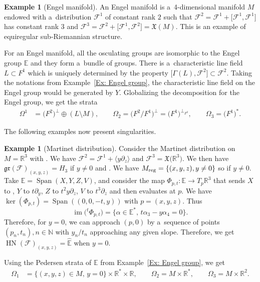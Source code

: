 \documentclass[pdftex]{sigma}
\newcommand{\tsp}[1]{{}^t \! #1} %
\newcommand{\Span}{\operatorname{Span}} %
\newcommand{\im}{\operatorname{im}} %
\newcommand{\R}{\mathbb R} %
\newcommand{\N}{\mathbb N} %
\newcommand{\F}{\mathcal{F}} %
\newcommand{\lag}{\langle}
\newcommand{\rag}{\rangle}
\newcommand{\HN}{\operatorname{HN}} %
\newcommand{\Fb}{\mathcal{F}} %
\newcommand{\gr}{\mathfrak{gr}} %
\numberwithin{equation}{section}
\theoremstyle{definition}
\newtheorem{ex}[thm]{Example}
\begin{document}
\begin{ex}[Engel manifold]
 An Engel manifold is a~4-dimensional manifold $M$ endowed with a~distribution $\F^1$ of constant rank $2$ such that $\F^2 = \F^1 + \big[\F^1,\F^1\big]$ has constant rank $3$ and $\F^3 = \F^2 + \big[\F^1,\F^2\big] = \mathfrak{X}(M)$. This is an example of equiregular sub-Riemannian structure.

 For an Engel manifold, all the osculating groups are isomorphic to the Engel group $\mathbb{E}$ and they form a~bundle of groups. There is a~characteristic line field $L \subset F^1$ which is uniquely determined by the property $\big[\Gamma(L),\F^2\big] \subset \F^2$. Taking the notations from Example~\ref{Ex: Engel group}, the characteristic line field on the Engel group would be generated by $Y$. Globalizing the decomposition for the Engel group, we get the strata
 \begin{align*}
 \Omega^1 &= \bigl(F^2\bigr)^{\perp} \oplus (L\setminus M) ,\qquad
 \Omega_2 = \bigl({F^2}/{F^1}\bigr)^{\perp} = \bigl(F^1\bigr)^{\perp_{F^2}} ,\qquad
 \Omega_3 = \bigl(F^1\bigr)^*.
 \end{align*}
\end{ex}

The following examples now present singularities.

\begin{ex}[Martinet distribution] \label{Ex: Martinet}
 Consider the Martinet distribution on $M = \R^3$ with \smash{$\F^1 = \big\lag \partial_x + \frac{y^2}{2}\partial_z,\partial_y\big\rag$}. We have $\F^2 = \F^1 + \lag y\partial_z\rag$ and $\F^3 = \mathfrak{X}\bigl(\R^3\bigr)$. We then have $\gr(\Fb)_{(x,y,z)} = H_3$ if $y\neq 0$ and \smash{$\gr(\Fb)_{(x,0,z)} = \mathbb{E}$}. We have $M_{\rm reg} = \{(x,y,z), y\neq 0\}$ so \smash{$\HN(\Fb)_{(x,y,z)} = \widehat{H_3}$} if $y\neq 0$.
 Take $\mathbb{E} = \Span(X,Y,Z,V)$, and consider the map $\Phi_{p,t} \colon \mathbb{E} \to T_p\R^3$ that sends $X$ to , $Y$ to $t\partial_y$, $Z$ to $t^2y\partial_z$, $V$ to $t^3\partial_z$ and then evaluates at $p$.
 We have $\ker(\Phi_{p,t}) = \Span((0,0,-t,y))$ with $p=(x,y,z)$. Thus
 \[\im\bigl(\tsp{}\Phi_{p,t}\bigr) = \{\alpha \in \mathbb{E}^*,\, t\alpha_3 -y\alpha_4=0\}.\]
 Therefore, for $y=0$, we can approach $(p,0)$ by a~sequence of points $(p_n,t_n), n\in \N$ with $y_n/t_n$ approaching any given slope. Therefore, we get $\HN(\Fb)_{(x,y,z)} = \widehat{\mathbb{E}}$ when $y=0$.

 Using the Pedersen strata of $\mathbb{E}$ from Example~\ref{Ex: Engel group}, we get
 \begin{align*}
 \Omega_1 &= \{(x,y,z) \in M,\, y=0\}\times \R^*\times \R,\qquad
 \Omega_2 = M \times \R^* ,\qquad
 \Omega_3 = M \times \R^2.
 \end{align*}
\end{ex}
\end{document}
